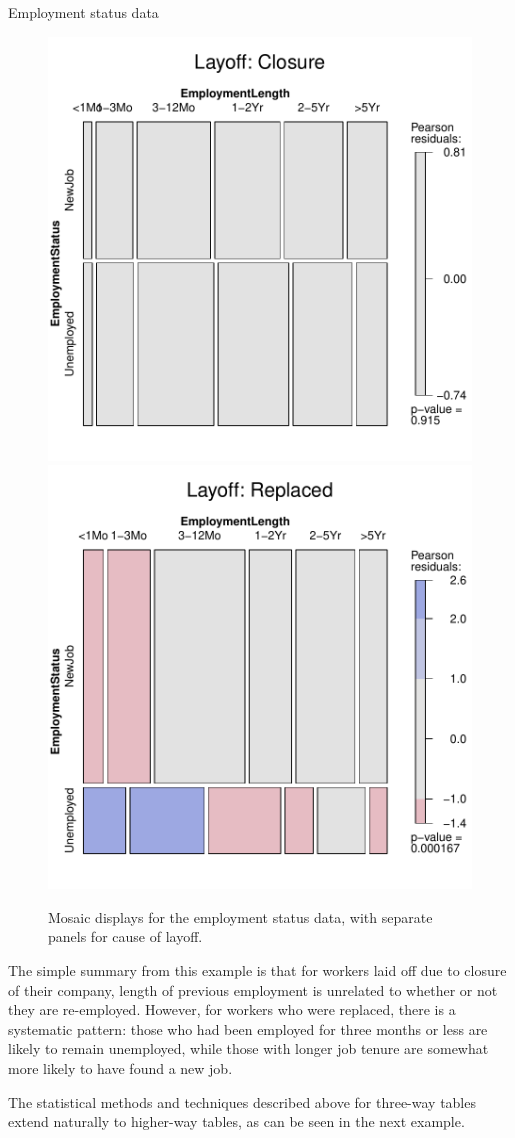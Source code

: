 \documentclass[10pt,krantz2]{krantz}\usepackage[]{graphicx}\usepackage[]{color}
\newenvironment{knitrout}{}{} %
\renewenvironment{knitrout}{\small\renewcommand{\baselinestretch}{.85}}{} %
\begin{document}
\begin{Example}[employ]{Employment status data}
\begin{knitrout}
\begin{figure}[!htbp]
\centerline{\includegraphics[width=.49\textwidth]{ch05/fig/employ-mos3-1} 
\includegraphics[width=.49\textwidth]{ch05/fig/employ-mos3-2} }

\caption[Mosaic displays for the employment status data, with separate panels for cause of layoff]{Mosaic displays for the employment status data, with separate panels for cause of layoff.\label{fig:employ-mos3}}
\end{figure}


\end{knitrout}
The simple summary from this example is that for workers laid off due to closure of
their company, length of previous employment is unrelated to whether or not they
are re-employed.  However, for workers who were replaced,
there is a systematic pattern:
those who had been employed for three months or less
are likely to remain unemployed, while those
with longer job tenure are somewhat more likely to have found a new job.
\end{Example}

The statistical methods and \R techniques described above for three-way tables
extend naturally to higher-way tables, as can be seen in the next example.
\end{document}
